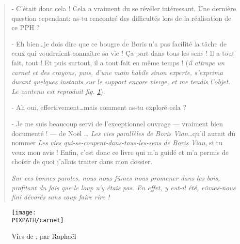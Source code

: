 \begin{quotation}
- C'était donc cela ! Cela a vraiment du se révéler intéressant. Une dernière question cependant:
as-tu rencontré des difficultés lors de la réalisation de ce PPH ?

- Eh bien\ldots je dois dire que ce bougre de Boris n'a pas facilité la tâche
de ceux qui voudraient connaître sa vie ! Ça part dans tous les sens ! Il a tout fait, tout !
Et puis surtout, il a tout fait en même temps !
(\emph{il attrape un carnet et des crayons, puis, d'une main habile sinon experte, s'exprima 
durant quelques instants sur le support encore vierge, et me tendis l'objet.
Le contenu est reproduit fig. \ref{carnet}}).

- Ah oui, effectivement\ldots mais comment as-tu exploré cela ?

- Je me suis beaucoup servi de l'exceptionnel ouvrage --- vraiment bien documenté ! --- de Noël \ldots
\emph{Les vies parallèles de Boris Vian}\ldots qu'il aurait dû nommer
\emph{Les vies qui-se-coupent-dans-tous-les-sens de Boris Vian}, si tu veux mon avis !
Enfin, c'est donc ce livre qui m'a guidé et m'a permis de choisir de quoi j'allais traiter
dans mon dossier.

\emph{Sur ces bonnes paroles, nous nous fûmes nous promener dans les bois,
profitant du fais que le loup n'y étais pas. En effet, y eut-il été,
eûmes-nous fini dévorés sans coup faire rire !}
 
\end{quotation}

\begin{figure}
\centering
\texttt{[image: \\PIXPATH/carnet]}
\caption{Vies de \BV, par Raphaël }
\label{carnet}
\end{figure}

